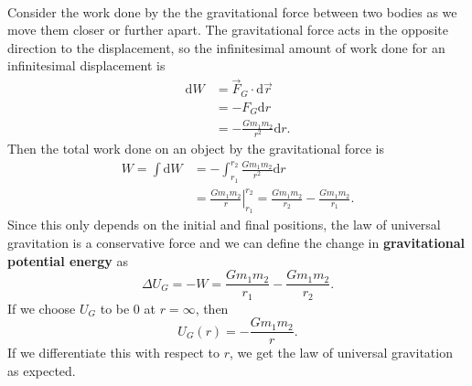 \documentclass[../classical_mechanics.tex]{subfiles}
\begin{document}
        \paragraph{}
        Consider the work done by the the gravitational force between two bodies as we move them closer or further apart.
        The gravitational force acts in the opposite direction to the displacement, so the infinitesimal amount of work done for an infinitesimal displacement is
        \begin{align}
            \mathrm{d}W&=\vec{F}_G\cdot\mathrm{d}\vec{r}\\
            &=-F_G\mathrm{d}r\\
            &=-\frac{Gm_1m_2}{r^2}\mathrm{d}r.
        \end{align}
        Then the total work done on an object by the gravitational force is
        \begin{align}
            W=\int\mathrm{d}W&=-\int_{r_1}^{r_2}\frac{Gm_1m_2}{r^2}\mathrm{d}r\\
            &=\left.\frac{Gm_1m_2}{r}\right|_{r_1}^{r_2}=\frac{Gm_1m_2}{r_2}-\frac{Gm_1m_2}{r_1}.
        \end{align}
        Since this only depends on the initial and final positions, the law of universal gravitation is a conservative force and we can define the change in \textbf{gravitational potential energy} as
        \begin{equation}
            \Delta U_G=-W=\frac{Gm_1m_2}{r_1}-\frac{Gm_1m_2}{r_2}.
        \end{equation}
        If we choose $U_G$ to be 0 at $r=\infty$, then
        \begin{equation}
            U_G(r)=-\frac{Gm_1m_2}{r}.
        \end{equation}
        If we differentiate this with respect to $r$, we get the law of universal gravitation as expected.
\end{document}
